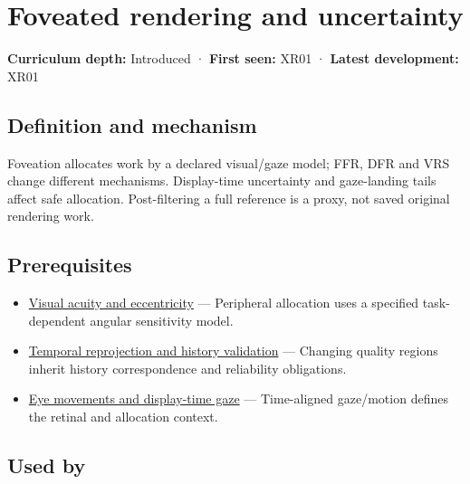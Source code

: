 \hypertarget{appendix-5878b813b732}{}\label{referencestart:appendix-5878b813b732}
\section{Foveated rendering and uncertainty}\label{appendix-5878b813b732-foveated-rendering-and-uncertainty}

\textbf{Curriculum depth:} Introduced · \textbf{First seen:} XR01 · \textbf{Latest development:} XR01

\begin{allmightroledefinition}

\subsection{Definition and mechanism}\label{appendix-5878b813b732-definition-and-mechanism}

Foveation allocates work by a declared visual/gaze model; FFR, DFR and VRS change different mechanisms. Display-time uncertainty and gaze-landing tails affect safe allocation. Post-filtering a full reference is a proxy, not saved original rendering work.

\end{allmightroledefinition}

\subsection{Prerequisites}\label{appendix-5878b813b732-prerequisites}

\begin{itemize}
\tightlist
\item
  \hyperref[appendix-b491fc48c54b]{Visual acuity and eccentricity} --- Peripheral allocation uses a specified task-dependent angular sensitivity model.
\item
  \hyperref[appendix-0727340a4428]{Temporal reprojection and history validation} --- Changing quality regions inherit history correspondence and reliability obligations.
\item
  \hyperref[appendix-a6f2c4fe1996]{Eye movements and display-time gaze} --- Time-aligned gaze/motion defines the retinal and allocation context.
\end{itemize}

\subsection{Used by}\label{appendix-5878b813b732-used-by}

